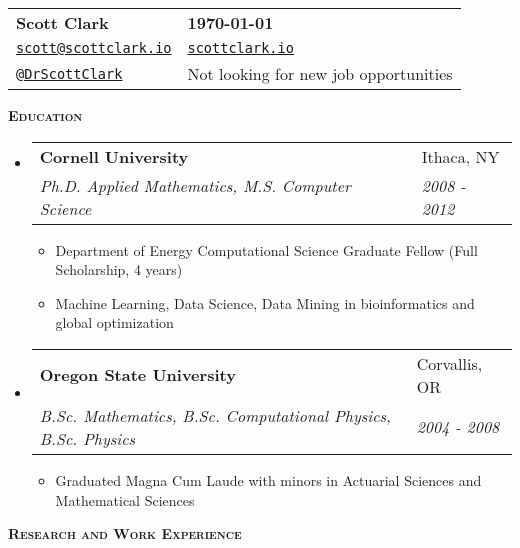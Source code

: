 \documentclass[letterpaper, 11pt]{article}
\makeatletter
\renewcommand{\section}[1]{%
  \begin{tcolorbox}
    \textsc{\textbf{\large{#1}}}
  \end{tcolorbox}
}
\newcommand{\entry}[4]{%
  \begin{tabularx}{\linewidth}{@{}Xl@{}}
    \textbf{#1} & #2          \\
    \textit{#3} & \textit{#4} \\
  \end{tabularx}
}
\newcommand{\email}[1]{%
  \href{mailto:#1}{\texttt{#1}}
}
\newcommand{\website}[1]{%
  \href{http://#1}{\texttt{#1}}
}
\newcommand{\twitter}[1]{%
  \href{https://twitter.com/#1}{\texttt{@#1}}
}
\makeatother
\begin{document}
  \begin{tabularx}{\linewidth}{@{}Xl@{}}
    \textbf{\Large{Scott Clark}} & \textbf{\today}                       \\
    \email{scott@scottclark.io}  & \website{scottclark.io}               \\
    \twitter{DrScottClark}       & Not looking for new job opportunities \\
  \end{tabularx}


\section{Education}


\begin{itemize}

\item
	\entry{Cornell University}{Ithaca, NY}{Ph.D. Applied Mathematics, M.S. Computer Science}{2008 - 2012}
	\begin{itemize}
		\item{Department of Energy Computational Science Graduate Fellow (Full Scholarship, 4 years)}
		\item{Machine Learning, Data Science, Data Mining in bioinformatics and global optimization}
	\end{itemize}

\item
	\entry{Oregon State University}{Corvallis, OR}{B.Sc. Mathematics, B.Sc. Computational Physics, B.Sc. Physics}{2004 - 2008}
	\begin{itemize}
		\item{Graduated Magna Cum Laude with minors in Actuarial Sciences and Mathematical Sciences}
	\end{itemize}

\end{itemize}


\section{Research and Work Experience}

\end{document}
